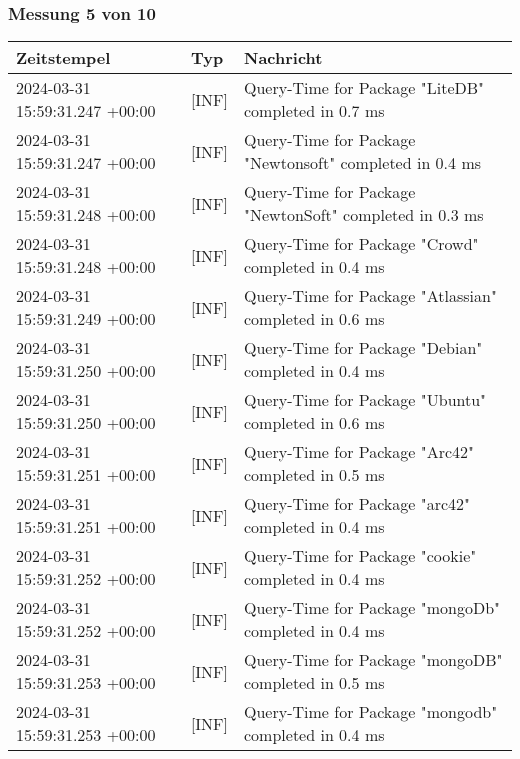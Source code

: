         \subsubsection{Messung 5 von 10} \label{subsubsec:MySQLMitIndex5von10}
        {
            {\small
                \begin{tabularx}{\textwidth}{|l|l|X|}
                    \hline
                    \textbf{Zeitstempel} & \textbf{Typ} & \textbf{Nachricht} \\
                    \hline
                    \endhead
                    2024-03-31 15:59:31.247 +00:00 & [INF] & Query-Time for Package "LiteDB" completed in 0.7 ms \\
                    2024-03-31 15:59:31.247 +00:00 & [INF] & Query-Time for Package "Newtonsoft" completed in 0.4 ms \\
                    2024-03-31 15:59:31.248 +00:00 & [INF] & Query-Time for Package "NewtonSoft" completed in 0.3 ms \\
                    2024-03-31 15:59:31.248 +00:00 & [INF] & Query-Time for Package "Crowd" completed in 0.4 ms \\
                    2024-03-31 15:59:31.249 +00:00 & [INF] & Query-Time for Package "Atlassian" completed in 0.6 ms \\
                    2024-03-31 15:59:31.250 +00:00 & [INF] & Query-Time for Package "Debian" completed in 0.4 ms \\
                    2024-03-31 15:59:31.250 +00:00 & [INF] & Query-Time for Package "Ubuntu" completed in 0.6 ms \\
                    2024-03-31 15:59:31.251 +00:00 & [INF] & Query-Time for Package "Arc42" completed in 0.5 ms \\
                    2024-03-31 15:59:31.251 +00:00 & [INF] & Query-Time for Package "arc42" completed in 0.4 ms \\
                    2024-03-31 15:59:31.252 +00:00 & [INF] & Query-Time for Package "cookie" completed in 0.4 ms \\
                    2024-03-31 15:59:31.252 +00:00 & [INF] & Query-Time for Package "mongoDb" completed in 0.4 ms \\
                    2024-03-31 15:59:31.253 +00:00 & [INF] & Query-Time for Package "mongoDB" completed in 0.5 ms \\
                    2024-03-31 15:59:31.253 +00:00 & [INF] & Query-Time for Package "mongodb" completed in 0.4 ms \\

\end{tabularx}}}
